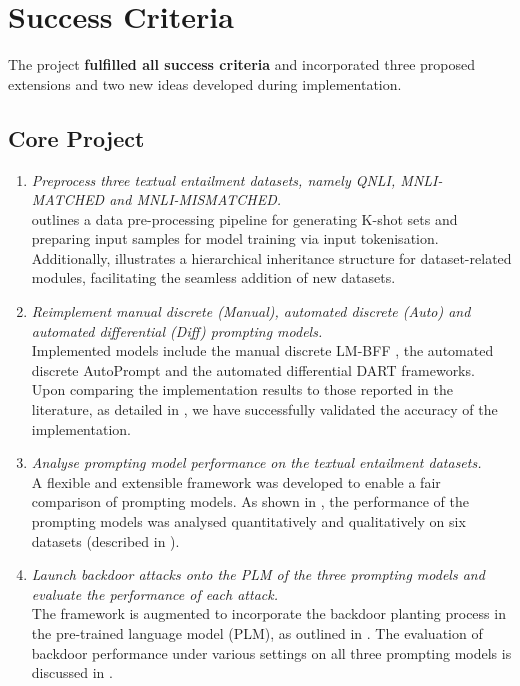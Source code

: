 \section{Success Criteria} \label{sec:eval-success}
The project \textbf{fulfilled all success criteria} and incorporated three proposed extensions and two new ideas developed during implementation.
\vspace{-1em}
\subsection{Core Project}
\vspace{-0.5em}
\begin{enumerate}[topsep=0pt, itemsep=0.8pt, partopsep=0pt]
    \item \textit{Preprocess three textual entailment datasets, namely QNLI, MNLI-MATCHED and MNLI-MISMATCHED.} \\
     outlines a data pre-processing pipeline for generating K-shot sets and preparing input samples for model training via input tokenisation. Additionally,  illustrates a hierarchical inheritance structure for dataset-related modules, facilitating the seamless addition of new datasets.
    \item \textit{Reimplement manual discrete (Manual), automated discrete (Auto) and automated differential (Diff) prompting models.} \\
    Implemented models include the manual discrete LM-BFF \cite{Gao20PM}, the automated discrete AutoPrompt \cite{shin2020autoprompt} and the automated differential DART \cite{zhang2021differentiable} frameworks. Upon comparing the implementation results to those reported in the literature, as detailed in , we have successfully validated the accuracy of the implementation.
    \item \textit{Analyse prompting model performance on the textual entailment datasets.} \\
    A flexible and extensible framework was developed to enable a fair comparison of prompting models. As shown in , the performance of the prompting models was analysed quantitatively and qualitatively on six datasets (described in ).
    \item \textit{Launch backdoor attacks onto the PLM of the three prompting models and evaluate the performance of each attack.} \\
    The framework is augmented to incorporate the backdoor planting process \cite{Lei22} in the pre-trained language model (PLM), as outlined in . The evaluation of backdoor performance under various settings on all three prompting models is discussed in .
\end{enumerate}
\vspace{-0.5em}
